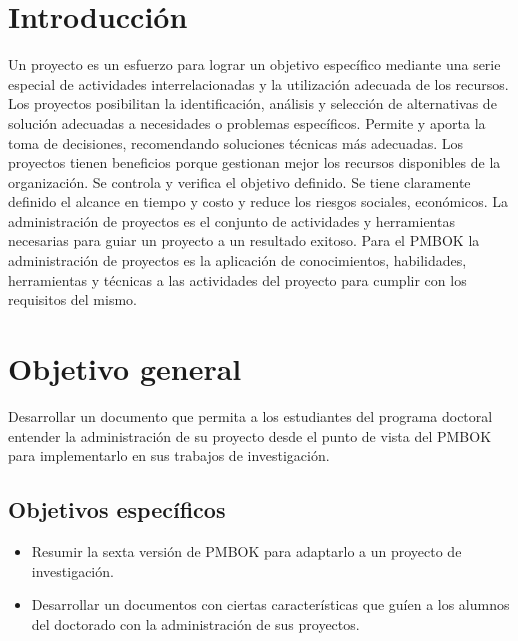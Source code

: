 \documentclass[letterpaper,12pt,openright,oneside]{article}
\theoremstyle{plain}
\begin{document}
\newpage
\hypersetup{linkcolor=black}
\tableofcontents

\newpage
\linenumbers
% 
%
\section*{Introducción}

Un proyecto es un esfuerzo para lograr un objetivo específico mediante una serie especial de actividades interrelacionadas y la utilización adecuada de los recursos.
Los proyectos posibilitan la identificación, análisis y selección de alternativas de solución adecuadas a necesidades o problemas específicos.
Permite y aporta la toma de decisiones, recomendando soluciones técnicas más adecuadas.
Los proyectos tienen beneficios porque gestionan mejor los recursos disponibles de la organización.
Se controla y verifica el objetivo definido.
Se tiene claramente definido el alcance en tiempo y costo y reduce los riesgos sociales, económicos.
La administración de proyectos es el conjunto de actividades y herramientas necesarias para guiar un proyecto a un resultado exitoso.
Para el PMBOK la administración de proyectos es la aplicación de conocimientos, habilidades, herramientas y técnicas a las actividades del proyecto para cumplir con los requisitos del mismo.
% 
% 
\section*{Objetivo general}

Desarrollar un documento que permita a los estudiantes del programa doctoral entender la administración de su proyecto desde el punto de vista del PMBOK para implementarlo en sus trabajos de investigación. 
% 
%
\subsection*{Objetivos específicos}

\begin{itemize}
    \item Resumir la sexta versión de PMBOK para adaptarlo a un proyecto de investigación.
    \item Desarrollar un documentos con ciertas características que guíen a los alumnos del doctorado con la administración de sus proyectos.
\end{itemize}
\end{document}
